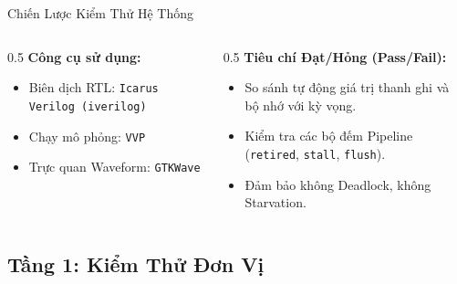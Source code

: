 \begin{frame}{Chiến Lược Kiểm Thử Hệ Thống}
    \vspace{0.3cm}
    \begin{columns}[T]
        \begin{column}{0.5\textwidth}
            \scriptsize
            \textbf{Công cụ sử dụng:}
            \begin{itemize}
                \item Biên dịch RTL: \texttt{Icarus Verilog (iverilog)}
                \item Chạy mô phỏng: \texttt{VVP}
                \item Trực quan Waveform: \texttt{GTKWave}
            \end{itemize}
        \end{column}
        \begin{column}{0.5\textwidth}
            \scriptsize
            \textbf{Tiêu chí Đạt/Hỏng (Pass/Fail):}
            \begin{itemize}
                \item So sánh tự động giá trị thanh ghi và bộ nhớ với kỳ vọng.
                \item Kiểm tra các bộ đếm Pipeline (\texttt{retired}, \texttt{stall}, \texttt{flush}).
                \item Đảm bảo không Deadlock, không Starvation.
            \end{itemize}
        \end{column}
    \end{columns}
\end{frame}

\subsection{Tầng 1: Kiểm Thử Đơn Vị}

